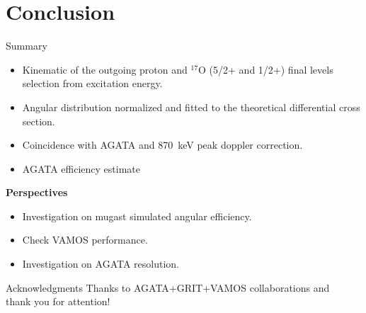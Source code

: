 \section{Conclusion}
\begin{frame}{Summary}
\vspace{-0.1\textheight}
\begin{itemize}	
		\item Kinematic of the outgoing proton and $^{17}$O (5/2+ and 1/2+) final levels selection from excitation energy.
		\item Angular distribution normalized and fitted to the theoretical differential cross section.
		\item Coincidence with AGATA and 870~keV peak doppler correction.
		\item AGATA efficiency estimate
\end{itemize}	
\textbf{Perspectives}
\begin{itemize}	
		\item Investigation on mugast simulated angular efficiency.
		\item Check VAMOS performance.
		\item Investigation on AGATA resolution.
\end{itemize}

\end{frame}

\begin{frame}{Acknowledgments}
\centering
Thanks to AGATA+GRIT+VAMOS collaborations and\\ thank you for attention!

\end{frame}